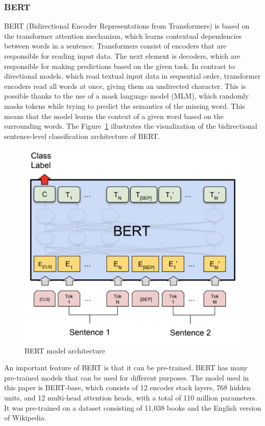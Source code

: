 \subsubsection{BERT}
BERT (Bidirectional Encoder Representations from Transformers) is based on the transformer attention mechanism, which learns contextual dependencies between words in a sentence. Transformers consist of encoders that are responsible for reading input data. The next element is decoders, which are responsible for making predictions based on the given task. In contrast to directional models, which read textual input data in sequential order, transformer encoders read all words at once, giving them an undirected character. This is possible thanks to the use of a mask language model (MLM), which randomly masks tokens while trying to predict the semantics of the missing word. This means that the model learns the context of a given word based on the surrounding words. The Figure~\ref{bert_architecture} illustrates the visualization of the bidirectional sentence-level classification architecture of BERT.

\begin{figure}[hbt!]
\centering
\includegraphics[width=0.75\linewidth]{bert_architecture.png}
\caption{BERT model architecture \autocite{Devlin2018}}
\label{bert_architecture}
\end{figure}

An important feature of BERT is that it can be pre-trained. BERT has many pre-trained models that can be used for different purposes. The model used in this paper is BERT-base, which consists of 12 encoder stack layers, 768 hidden units, and 12 multi-head attention heads, with a total of 110 million parameters. It was pre-trained on a dataset consisting of 11,038 books and the English version of Wikipedia.

